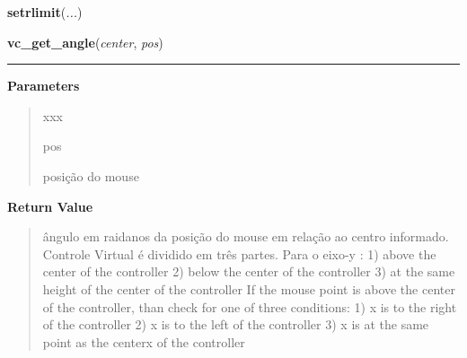     \label{pygame-asteroids:states:franchise':setrlimit}

    \vspace{0.5ex}

\hspace{.8\funcindent}\begin{boxedminipage}{\funcwidth}

    \raggedright \textbf{setrlimit}(\textit{...})

\setlength{\parskip}{2ex}
\setlength{\parskip}{1ex}
    \end{boxedminipage}

    \label{virtual_controller:vc_get_angle}

    \vspace{0.5ex}

\hspace{.8\funcindent}\begin{boxedminipage}{\funcwidth}

    \raggedright \textbf{vc\_get\_angle}(\textit{center}, \textit{pos})

    \vspace{-1.5ex}

    \rule{\textwidth}{0.5\fboxrule}
\setlength{\parskip}{2ex}
\setlength{\parskip}{1ex}
      \textbf{Parameters}
      \vspace{-1ex}

      \begin{quote}
        \begin{Ventry}{xxx}

          \item[pos]

          posição do mouse

        \end{Ventry}

      \end{quote}

      \textbf{Return Value}
    \vspace{-1ex}

      \begin{quote}
      ângulo em raidanos da posição do mouse em relação ao centro 
      informado. Controle Virtual é dividido em três partes. Para o eixo-y 
      : 1) above the center of the controller 2) below the center of the 
      controller 3) at the same height of the center of the controller If 
      the mouse point is above the center of the controller, than check for
      one of three conditions: 1) x is to the right of the controller 2) x 
      is to the left of the controller 3) x is at the same point as the 
      centerx of the controller

      \end{quote}

    \end{boxedminipage}


